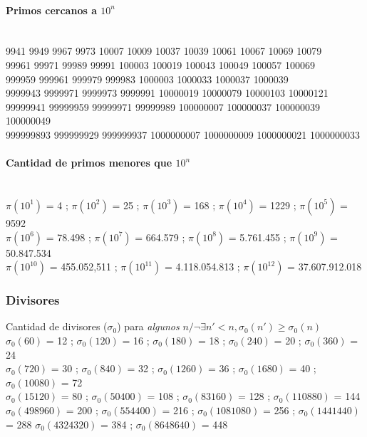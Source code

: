 \documentclass[10pt,landscape,twocolumn,a4paper,notitlepage]{article}
\begin{document}
\paragraph{Primos cercanos a $10^n$}\ \\
9941 9949 9967 9973 10007 10009 10037 10039 10061 10067 10069 10079\\
99961 99971 99989 99991 100003 100019 100043 100049 100057 100069\\
999959 999961 999979 999983 1000003 1000033 1000037 1000039\\
9999943 9999971 9999973 9999991 10000019 10000079 10000103 10000121\\
99999941 99999959 99999971 99999989 100000007 100000037 100000039 100000049\\
999999893 999999929 999999937 1000000007 1000000009 1000000021 1000000033

\paragraph{Cantidad de primos menores que $10^n$}\ \\
$\pi(10^1)$ = 4 ;
$\pi(10^2)$ = 25 ;
$\pi(10^3)$ = 168 ;
$\pi(10^4)$ = 1229 ;
$\pi(10^5)$ = 9592 \\
$\pi(10^6)$ = 78.498 ;
$\pi(10^7)$ = 664.579 ;
$\pi(10^8)$ = 5.761.455 ;
$\pi(10^9)$ = 50.847.534 \\
$\pi(10^{10})$ = 455.052,511 ;
$\pi(10^{11})$ = 4.118.054.813 ;
$\pi(10^{12})$ = 37.607.912.018%
%
%
%
\subsubsection{Divisores}
Cantidad de divisores ($\sigma_0$) para \emph{algunos} $n / \neg\exists n'<n, \sigma_0(n') \geqslant \sigma_0(n)$ \\
$\sigma_0(60)$ = 12 ; $\sigma_0(120)$ = 16 ; $\sigma_0(180)$ = 18 ; $\sigma_0(240)$ = 20 ; $\sigma_0(360)$ = 24 \\
$\sigma_0(720)$ = 30 ; $\sigma_0(840)$ = 32 ; $\sigma_0(1260)$ = 36 ; $\sigma_0(1680)$ = 40 ; $\sigma_0(10080)$ = 72 \\ $\sigma_0(15120)$ = 80 ; $\sigma_0(50400)$ = 108 ; $\sigma_0(83160)$ = 128 ; $\sigma_0(110880)$ = 144 \\
$\sigma_0(498960)$ = 200 ; $\sigma_0(554400)$ = 216 ; $\sigma_0(1081080)$ = 256 ; $\sigma_0(1441440)$ = 288  $\sigma_0(4324320)$ = 384 ; $\sigma_0(8648640)$ = 448
\end{document}
